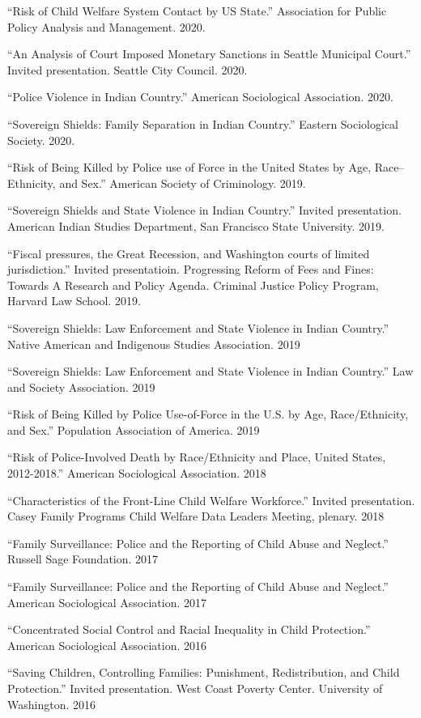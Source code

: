 \documentclass[margin,line]{res}
\begin{document}
\begin{resume}
``Risk of Child Welfare System Contact by US State.'' Association for Public Policy Analysis and Management. 2020. 

``An Analysis of Court Imposed Monetary Sanctions in Seattle Municipal Court.'' Invited presentation. Seattle City Council. 2020.

``Police Violence in Indian Country.'' American Sociological Association. 2020.

``Sovereign Shields: Family Separation in Indian Country.'' Eastern Sociological Society. 2020.

``Risk of Being Killed by Police use of Force in the United States by Age, Race–Ethnicity, and Sex.'' American Society of Criminology. 2019.

``Sovereign Shields and State Violence in Indian Country.'' Invited presentation. American Indian Studies Department, San Francisco State University. 2019.

``Fiscal pressures, the Great Recession, and Washington courts of limited jurisdiction.'' Invited presentatioin. Progressing Reform of Fees and Fines: Towards A Research and Policy Agenda. Criminal Justice Policy Program, Harvard Law School. 2019.

``Sovereign Shields: Law Enforcement and State Violence in Indian Country.'' Native American and Indigenous Studies Association. 2019

``Sovereign Shields: Law Enforcement and State Violence in Indian Country.'' Law and Society Association. 2019

``Risk of Being Killed by Police Use-of-Force in the U.S. by Age, Race/Ethnicity, and Sex.'' Population Association of America. 2019

``Risk of Police-Involved Death by Race/Ethnicity and Place, United States, 2012-2018.'' American Sociological Association. 2018

``Characteristics of the Front-Line Child Welfare Workforce.'' Invited presentation. Casey Family Programs Child Welfare Data Leaders Meeting, plenary. 2018

``Family Surveillance: Police and the Reporting of Child Abuse and Neglect.'' Russell Sage Foundation. 2017

``Family Surveillance: Police and the Reporting of Child Abuse and Neglect.'' American Sociological Association. 2017

``Concentrated Social Control and Racial Inequality in Child Protection.'' American Sociological Association. 2016

``Saving Children, Controlling Families: Punishment, Redistribution, and Child Protection.'' Invited presentation. West Coast Poverty Center. University of Washington. 2016


\end{resume}
\end{document}
